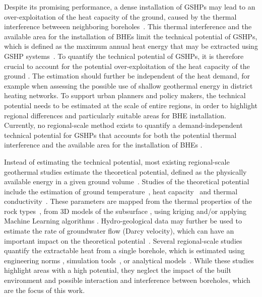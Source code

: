 Despite its promising performance, a dense installation of GSHPs may lead to an over-exploitation of the heat capacity of the ground, caused by the thermal interference betweeen neighboring boreholes~\cite{rivera_increased_2017}.
This thermal interference and the available area for the installation of BHEs limit the technical potential of GSHPs, which is defined as the maximum annual heat energy that may be extracted using GSHP systems~\cite{miglani_methodology_2018}.
To quantify the technical potential of GSHPs,
it is therefore crucial to account for the potential over-exploitation of the heat capacity of the ground \cite{alcaraz_t-i-ger_2017}.
The estimation should further be independent of the heat demand, for example when assessing the possible use of shallow geothermal energy in district heating networks. %
To support urban planners and policy makers, the technical potential needs to be estimated at the scale of entire regions, in order to highlight regional differences and particularly suitable areas for BHE installation.
Currently, no regional-scale method exists to quantify a demand-independent technical potential for GSHPs that accounts for both the potential thermal interference and the available area for the installation of BHEs \cite{bayer_geothermal_2019}.

Instead of estimating the technical potential, most existing regional-scale geothermal studies 
estimate the theoretical potential, 
defined as the physically available energy in a given ground volume~\cite{bayer_geothermal_2019}. 
Studies of the theoretical potential include the estimation of ground temperature~\cite{majorowicz_estimation_2009}, heat capacity~\cite{tian_improved_2020} and thermal conductivity~\cite{bertermann_pan-european_2015}. 
These parameters are mapped from the thermal properties of the rock types~\cite{gemelli_gis-based_2011, perego_techno-economic_2019}, from 3D models of the subsurface \cite{garcia-gil_gis-supported_2015}, using kriging \cite{munoz_estimating_2015} and/or applying Machine Learning algorithms \cite{assouline_machine_2019}. 
Hydro-geological data may further be used to estimate the rate of groundwater flow (Darcy velocity), which can have an important impact on the theoretical potential~\cite{alcaraz_advection_2016, viesi_gis-supported_2018}.
Several regional-scale studies quantify the extractable heat from a single borehole, which is estimated using engineering norms \cite{tissen_groundwater_2019}, simulation tools~\cite{galgaro_empirical_2015}, or analytical models~\cite{noorollahi_thermo-economic_2017, casasso_g.pot:_2016}. 
While these studies highlight areas with a high potential, they neglect the impact of the built environment and possible interaction and interference between boreholes, which are the focus of this work.

